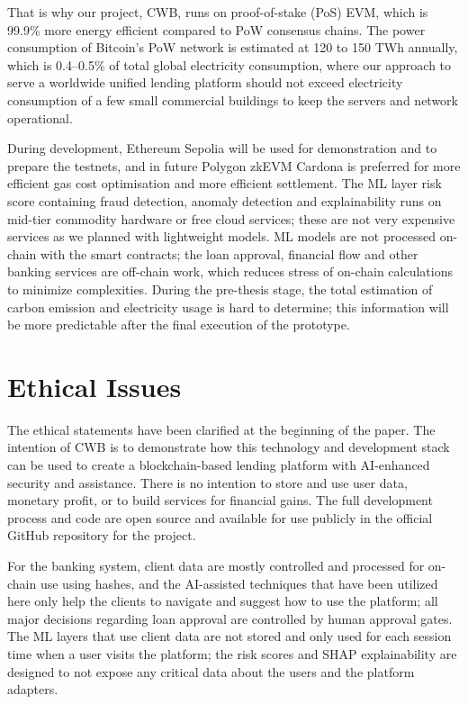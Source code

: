 That is why our project, CWB, runs on proof-of-stake (PoS) EVM, which is 99.9\% more energy efficient compared to PoW consensus chains. The power consumption of Bitcoin's PoW network is estimated at 120 to 150 TWh annually, which is 0.4--0.5\% of total global electricity consumption, where our approach to serve a worldwide unified lending platform should not exceed electricity consumption of a few small commercial buildings to keep the servers and network operational.

During development, Ethereum Sepolia will be used for demonstration and to prepare the testnets, and in future Polygon zkEVM Cardona is preferred for more efficient gas cost optimisation and more efficient settlement. The ML layer risk score containing fraud detection, anomaly detection and explainability runs on mid-tier commodity hardware or free cloud services; these are not very expensive services as we planned with lightweight models. ML models are not processed on-chain with the smart contracts; the loan approval, financial flow and other banking services are off-chain work, which reduces stress of on-chain calculations to minimize complexities. During the pre-thesis stage, the total estimation of carbon emission and electricity usage is hard to determine; this information will be more predictable after the final execution of the prototype.

\section{Ethical Issues}
\label{sec:ethical-issues}
The ethical statements have been clarified at the beginning of the paper. The intention of CWB is to demonstrate how this technology and development stack can be used to create a blockchain-based lending platform with AI-enhanced security and assistance. There is no intention to store and use user data, monetary profit, or to build services for financial gains. The full development process and code are open source and available for use publicly in the official GitHub repository for the project.

For the banking system, client data are mostly controlled and processed for on-chain use using hashes, and the AI-assisted techniques that have been utilized here only help the clients to navigate and suggest how to use the platform; all major decisions regarding loan approval are controlled by human approval gates. The ML layers that use client data are not stored and only used for each session time when a user visits the platform; the risk scores and SHAP explainability are designed to not expose any critical data about the users and the platform adapters.

